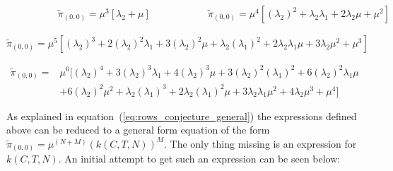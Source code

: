 \begin{multicols}{2}
    \begin{figure}[H]
        \centering
        \scalebox{0.8}{
            }
    \end{figure}
    \columnbreak
    \begin{figure}[H]
        \centering
        \scalebox{0.7}{
            }
    \end{figure}
\end{multicols}
\vspace{-0.5cm}
\begin{alignat}{2} \label{eq:00_rate_1131}
    \hspace{4em} & \tilde{\pi}_{(0,0)} = \mu^3[\lambda_2 + \mu] \hspace{5em} &
    \tilde{\pi}_{(0,0)} = \mu^4[(\lambda_2)^2 + \lambda_2 \lambda_1 + 2\lambda_2
    \mu + \mu^2]
\end{alignat}


\begin{figure}[H]
    \centering
    \scalebox{0.8}{
        }
\end{figure}
\begin{equation}\label{eq:00_rate_1141}
    \tilde{\pi}_{(0,0)} = \mu^5[(\lambda_2)^3 + 2(\lambda_2)^2 \lambda_1 +
    3(\lambda_2)^2 \mu + \lambda_2 (\lambda_1)^2 + 2\lambda_2 \lambda_1 \mu +
    3\lambda_2 \mu^2 + \mu^3]
\end{equation}

\begin{figure}[H]
    \centering
    \scalebox{0.8}{
        }
\end{figure}
\begin{align}\label{eq:00_rate_1151}
    \tilde{\pi}_{(0,0)} =& \mu^6[(\lambda_2)^4 + 3(\lambda_2)^3 \lambda_1 +
    4(\lambda_2)^3 \mu + 3(\lambda_2)^2 (\lambda_1)^2 +
    6(\lambda_2)^2 \lambda_1 \mu \\
    & + 6(\lambda_2)^2 \mu^2 + \lambda_2 (\lambda_1)^3 +
    2\lambda_2 (\lambda_1)^2 \mu + 3\lambda_2 \lambda_1 \mu^2 +
    4\lambda_2 \mu^3 + \mu^4] \nonumber
\end{align}


As explained in equation~(\ref{eq:rows_conjecture_general}) the expressions
defined above can be reduced to a general form equation of the form
\(\tilde{\pi}_{(0,0)} = \mu^{(N+M)} (k(C,T,N))^M\).
The only thing missing is an expression for \(k(C,T,N)\).
An initial attempt to get such an expression can be seen below:


